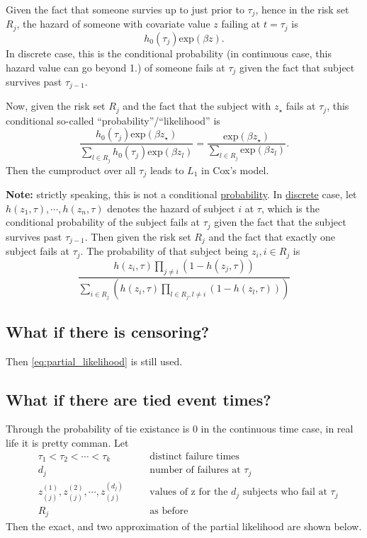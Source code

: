 \documentclass[a4paper,12pt]{article}
\begin{document}
Given the fact that someone survies up to just prior to $\tau_j$, hence in the risk set $R_j$, the hazard of someone with covariate value $z$ failing at $t = \tau_j$ is
\[
  h_0\left(\tau_j\right)\mathrm{exp}\left(\beta z\right)
  .
\]
In discrete case, this is the conditional probability {\color{blue}(in continuous case, this hazard value can go beyond 1.)} of someone fails at $\tau_j$ given the fact that subject survives past $\tau_{j - 1}$.
\par
Now, given the risk set $R_j$ and the fact that the subject with $z_\star$ fails at $\tau_j$, this conditional so-called ``probability''/``likelihood'' is
\[
  \frac{h_0\left(\tau_j\right)\mathrm{exp}\left(\beta z_\star\right)}{
    \sum\limits_{l\in R_j}h_0\left(\tau_j\right)\mathrm{exp}\left(\beta z_l\right)
  }
  = \frac{
    \mathrm{exp}\left(\beta z_\star\right)
  }{
    \sum\limits_{l\in R_j}\mathrm{exp}\left(\beta z_l\right)
  }
  .
\]
Then the cumproduct over all $\tau_j$ leads to $L_1$ in Cox's model.
\par
\textbf{Note:} strictly speaking, this is not a conditional \underline{probability}. In \underline{discrete} case, let $h\left(z_1, \tau\right), \cdots, h\left(z_n, \tau\right)$ denotes the hazard of subject $i$ at $\tau$, which is the conditional probability of the subject fails at $\tau_j$ given the fact that the subject survives past $\tau_{j - 1}$. Then given the risk set $R_j$ and the fact that exactly one subject fails at $\tau_j$. The probability of that subject being $z_i, i\in R_j$ is
\[
  \frac{h\left(z_i, \tau\right)
    \prod\limits_{j\neq i}\left(1 - h\left(z_j, \tau\right)\right)}{
    \sum\limits_{i \in R_j}\left(
      h\left(z_i, \tau\right)
      \prod\limits_{l\in R_j, l\neq i}\left(1 - h\left(z_l, \tau\right)\right)
    \right)
  }
\]


\subsection{What if there is censoring?}
\label{sec:what-if-theres}

Then \eqref{eq:partial_likelihood} is still used.

\subsection{What if there are tied event times?}
\label{sec:what-if-there}

Through the probability of tie existance is 0 in the continuous time case, in real life it is pretty comman. Let
\[
  \begin{aligned}
    & \tau_1 < \tau_2 < \cdots < \tau_k
    &&\quad \text{distinct failure times}    \\
    & d_j
    &&\quad \text{number of failures at $\tau_j$}    \\
    & z_{\left(j\right)}^{\left(1\right)}, z_{\left(j\right)}^{\left(2\right)}, \cdots, z_{\left(j\right)}^{\left(d_j\right)}
    &&\quad \text{values of z for the $d_j$ subjects who fail at $\tau_j$}    \\
    & R_j &&\quad \text{as before}
  \end{aligned}
\]
Then the exact, and two approximation of the partial likelihood are shown below.
\end{document}
